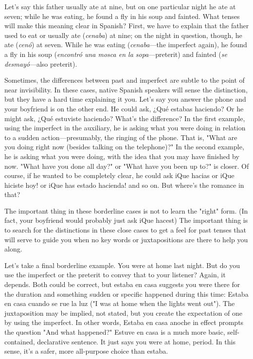 \documentclass[14pt,a4paper,oneside]{memoir}
\begin{document}
Let's say this father usually ate at nine, but on one particular
night he ate at seven; while he was eating, he found a fly in his soup
and fainted. What tenses will make this meaning clear in Spanish?
First, we have to explain that the father used to eat or usually ate (\emph{cenaba}) at nine; on the night in question, though, he ate (\emph{cenó}) at seven.
While he was eating (\emph{cenaba}---the imperfect again), he found a fly in
his soup (\emph{encontró una mosca en la sopa}---preterit) and fainted (\emph{se desmayó}---also preterit).

Sometimes, the differences between past and imperfect are
subtle to the point of near invisibility. In these cases, native Spanish
speakers will sense the distinction, but they have a hard time explaining it you. Let's say you answer the phone and your boyfriend is on the
other end. He could ask, ¿Qué estabas haciendo? Or he might ask,
¿Qué estuviste haciendo? What's the difference? In the first example,
using the imperfect in the auxiliary, he is asking what you were doing
in relation to a sudden action---presumably, the ringing of the phone.
That is, "What are you doing right now (besides talking on the telephone)?" In the second example, he is asking what you were doing,
with the idea that you may have finished by now. "What have you
done all day?" or "What have you been up to?" is closer. Of course, if
he wanted to be completely clear, he could ask iQue hacias or iQue
hiciste hoy! or iQue has estado hacienda! and so on. But where's the
romance in that?

The important thing in these borderline cases is not to learn
the "right" form. (In fact, your boyfriend would probably just ask iQue
hacest) The important thing is to search for the distinctions in these
close cases to get a feel for past tenses that will serve to guide you
when no key words or juxtapositions are there to help you along.

Let's take a final borderline example. You were at home last
night. But do you use the imperfect or the preterit to convey that to
your listener? Again, it depends. Both could be correct, but estaba en
casa suggests you were there for the duration and something sudden or
specific happened during this time: Estaba en casa cuando se rue la
luz ("I was at home when the lights went out"). The juxtaposition may
be implied, not stated, but you create the expectation of one by using
the imperfect. In other words, Estaba en casa anoche in effect prompts
the question "And what happened?" Estuve en casa is a much more
basic, self-contained, declarative sentence. It just says you were at
home, period. In this sense, it's a safer, more all-purpose choice than
estaba.
\end{document}
